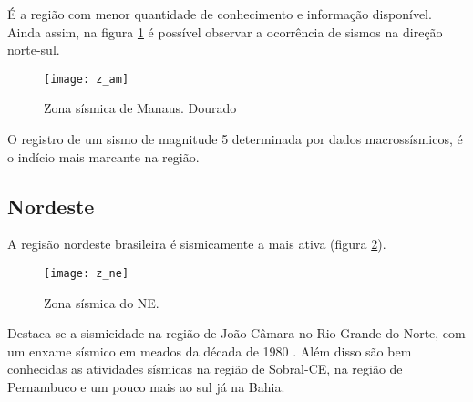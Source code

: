 É a região com menor quantidade de conhecimento e informação disponível.
Ainda assim, na figura \ref{fig:z_am} é possível observar a ocorrência de sismos
na direção norte-sul.

\begin{figure}[H]
  \centering
  \texttt{[image: z\_am]} 
  \caption{Zona sísmica de Manaus. Dourado}
  \label{fig:z_am} 
\end{figure}

O registro de um sismo de magnitude 5 determinada por dados macrossísmicos,
é o indício mais marcante na região.


\subsection{Nordeste}
\label{sec:z_ne}

A regisão nordeste brasileira é sismicamente a mais ativa (figura \ref{fig:z_ne}). 

\begin{figure}[H]
  \centering
  \texttt{[image: z\_ne]} 
  \caption{Zona sísmica do NE. \citet{dourado_2014}}
  \label{fig:z_ne} 
\end{figure}

Destaca-se a sismicidade na região de João Câmara no Rio Grande do Norte,
com um enxame sísmico em meados da década de 1980 \citep{takeya_1989, bezerra_1998}. 
Além disso são bem conhecidas as atividades sísmicas na região de Sobral-CE,
na região de Pernambuco e um pouco mais ao sul já na Bahia.


